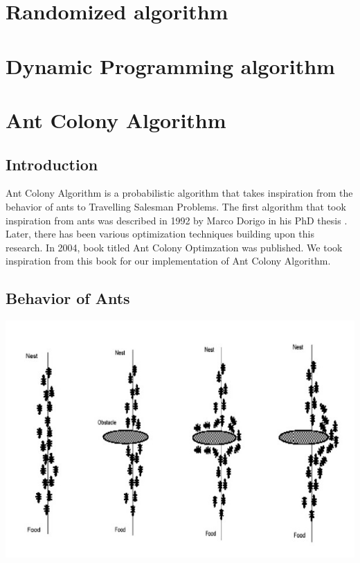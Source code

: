 \documentclass[11pt, english]{article}
\begin{document}
\section{Randomized algorithm}	
	
 \section{Dynamic Programming algorithm}	
	

\section{Ant Colony Algorithm}

\subsection{Introduction}

Ant Colony Algorithm is a probabilistic algorithm that takes inspiration from the behavior of ants to Travelling Salesman Problems. The first algorithm that took inspiration from ants was described in 1992 by Marco Dorigo in his PhD thesis \cite{Dorigothesis}. Later, there has been various optimization techniques building upon this research. In 2004, book titled Ant Colony Optimzation was published. We took inspiration from this book for our implementation of Ant Colony Algorithm.

\subsection{Behavior of Ants}

\begin{center}
\includegraphics[scale=0.5]{antfood.jpg}
\end{center}
\end{document}
